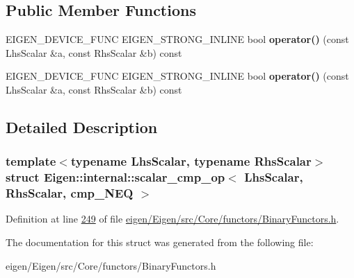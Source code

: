 \subsection*{Public Member Functions}
\begin{DoxyCompactItemize}
\item 
\mbox{\label{struct_eigen_1_1internal_1_1scalar__cmp__op_3_01_lhs_scalar_00_01_rhs_scalar_00_01cmp___n_e_q_01_4_a91abbd3c0cd1bcfe4a16f24b4c34b560}} 
E\+I\+G\+E\+N\+\_\+\+D\+E\+V\+I\+C\+E\+\_\+\+F\+U\+NC E\+I\+G\+E\+N\+\_\+\+S\+T\+R\+O\+N\+G\+\_\+\+I\+N\+L\+I\+NE bool {\bfseries operator()} (const Lhs\+Scalar \&a, const Rhs\+Scalar \&b) const
\item 
\mbox{\label{struct_eigen_1_1internal_1_1scalar__cmp__op_3_01_lhs_scalar_00_01_rhs_scalar_00_01cmp___n_e_q_01_4_a91abbd3c0cd1bcfe4a16f24b4c34b560}} 
E\+I\+G\+E\+N\+\_\+\+D\+E\+V\+I\+C\+E\+\_\+\+F\+U\+NC E\+I\+G\+E\+N\+\_\+\+S\+T\+R\+O\+N\+G\+\_\+\+I\+N\+L\+I\+NE bool {\bfseries operator()} (const Lhs\+Scalar \&a, const Rhs\+Scalar \&b) const
\end{DoxyCompactItemize}


\subsection{Detailed Description}
\subsubsection*{template$<$typename Lhs\+Scalar, typename Rhs\+Scalar$>$\newline
struct Eigen\+::internal\+::scalar\+\_\+cmp\+\_\+op$<$ Lhs\+Scalar, Rhs\+Scalar, cmp\+\_\+\+N\+E\+Q $>$}



Definition at line \hyperlink{eigen_2_eigen_2src_2_core_2functors_2_binary_functors_8h_source_l00249}{249} of file \hyperlink{eigen_2_eigen_2src_2_core_2functors_2_binary_functors_8h_source}{eigen/\+Eigen/src/\+Core/functors/\+Binary\+Functors.\+h}.



The documentation for this struct was generated from the following file\+:\begin{DoxyCompactItemize}
\item 
eigen/\+Eigen/src/\+Core/functors/\+Binary\+Functors.\+h\end{DoxyCompactItemize}

